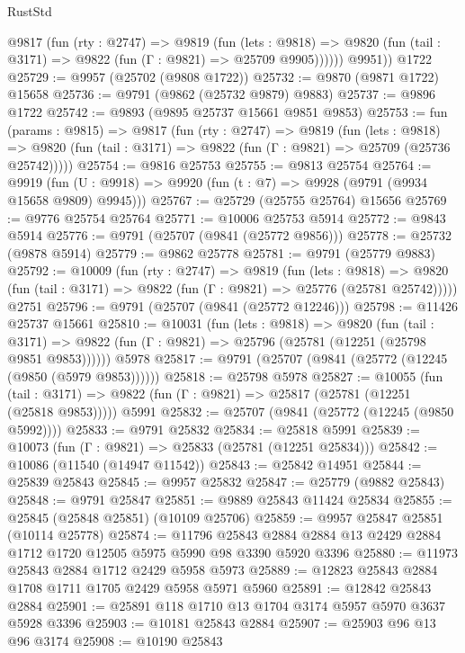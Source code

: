 \begin{lexlean}{RustStd}
\begin{coremodule}
          @9817
            (fun (rty : @2747) =>
            @9819
              (fun (lets : @9818) =>
              @9820 (fun (tail : @3171) => @9822 (fun (Γ : @9821) => @25709 @9905))))))
        @9951))
    @1722
@25729 := @9957 (@25702 (@9808 @1722))
@25732 := @9870 (@9871 @1722) @15658
@25736 := @9791 (@9862 (@25732 @9879) @9883)
@25737 := @9896 @1722
@25742 := @9893 (@9895 @25737 @15661 @9851 @9853)
@25753 := fun (params : @9815) =>
  @9817
    (fun (rty : @2747) =>
    @9819
      (fun (lets : @9818) =>
      @9820 (fun (tail : @3171) => @9822 (fun (Γ : @9821) => @25709 (@25736 @25742)))))
@25754 := @9816 @25753
@25755 := @9813 @25754
@25764 := @9919
    (fun (U : @9918) => @9920 (fun (t : @7) => @9928 (@9791 (@9934 @15658 @9809) @9945)))
@25767 := @25729 (@25755 @25764) @15656
@25769 := @9776 @25754 @25764
@25771 := @10006 @25753 @5914
@25772 := @9843 @5914
@25776 := @9791 (@25707 (@9841 (@25772 @9856)))
@25778 := @25732 (@9878 @5914)
@25779 := @9862 @25778
@25781 := @9791 (@25779 @9883)
@25792 := @10009
    (fun (rty : @2747) =>
    @9819
      (fun (lets : @9818) =>
      @9820 (fun (tail : @3171) => @9822 (fun (Γ : @9821) => @25776 (@25781 @25742)))))
    @2751
@25796 := @9791 (@25707 (@9841 (@25772 @12246)))
@25798 := @11426 @25737 @15661
@25810 := @10031
    (fun (lets : @9818) =>
    @9820
      (fun (tail : @3171) =>
      @9822 (fun (Γ : @9821) => @25796 (@25781 (@12251 (@25798 @9851 @9853))))))
    @5978
@25817 := @9791 (@25707 (@9841 (@25772 (@12245 (@9850 (@5979 @9853))))))
@25818 := @25798 @5978
@25827 := @10055
    (fun (tail : @3171) => @9822 (fun (Γ : @9821) => @25817 (@25781 (@12251 (@25818 @9853)))))
    @5991
@25832 := @25707 (@9841 (@25772 (@12245 (@9850 @5992))))
@25833 := @9791 @25832
@25834 := @25818 @5991
@25839 := @10073 (fun (Γ : @9821) => @25833 (@25781 (@12251 @25834)))
@25842 := @10086 (@11540 (@14947 @11542))
@25843 := @25842 @14951
@25844 := @25839 @25843
@25845 := @9957 @25832
@25847 := @25779 (@9882 @25843)
@25848 := @9791 @25847
@25851 := @9889 @25843 @11424 @25834
@25855 := @25845 (@25848 @25851) (@10109 @25706)
@25859 := @9957 @25847 @25851 (@10114 @25778)
@25874 := @11796
    @25843
    @2884
    @2884
    @13
    @2429
    @2884
    @1712
    @1720
    @12505
    @5975
    @5990
    @98
    @3390
    @5920
    @3396
@25880 := @11973 @25843 @2884 @1712 @2429 @5958 @5973
@25889 := @12823 @25843 @2884 @1708 @1711 @1705 @2429 @5958 @5971 @5960
@25891 := @12842 @25843 @2884
@25901 := @25891 @118 @1710 @13 @1704 @3174 @5957 @5970 @3637 @5928 @3396
@25903 := @10181 @25843 @2884
@25907 := @25903 @96 @13 @96 @3174
@25908 := @10190 @25843

\end{coremodule}
\end{lexlean}
